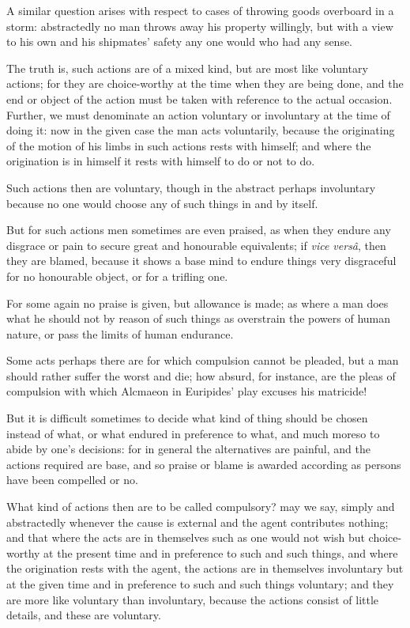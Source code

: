 A similar question arises with respect to cases of throwing goods overboard in
a storm: abstractedly no man throws away his property willingly, but with a
view to his own and his shipmates’ safety any one would who had any
sense.

The truth is, such actions are of a mixed kind, but are most like voluntary
actions; for they are choice-worthy at the time when they are being done, and
the end or object of the action must be taken with reference to the actual
occasion. Further, we must denominate an action voluntary or involuntary at the
time of doing it: now in the given case the man acts voluntarily, because the
originating of the motion of his limbs in such actions rests with himself; and
where the origination is in himself it rests with himself to do or not to do.

Such actions then are voluntary, though in the abstract perhaps involuntary
because no one would choose any of such things in and by itself.

But for such actions men sometimes are even praised, as when they endure any
disgrace or pain to secure great and honourable equivalents; if \emph{vice
versâ}, then they are blamed, because it shows a base mind to endure things
very disgraceful for no honourable object, or for a trifling one.

For some again no praise is given, but allowance is made; as where a man does
what he should not by reason of such things as overstrain the powers of human
nature, or pass the limits of human endurance.

Some acts perhaps there are for which compulsion cannot be pleaded, but a man
should rather suffer the worst and die; how absurd, for instance, are the pleas
of compulsion with which Alcmaeon in Euripides’ play excuses his
matricide!

But it is difficult sometimes to decide what kind of thing should be chosen
instead of what, or what endured in preference to what, and much moreso to
abide by one’s decisions: for in general the alternatives are painful,
and the actions required are base, and so praise or blame is awarded according
as persons have been compelled or no.

What kind of actions then are to be called compulsory? may we say, simply and
abstractedly whenever the cause is external and the agent contributes nothing;
and that where the acts are in themselves such as one would not wish but
choice-worthy at the present time and in preference to such and such things,
and where the origination rests with the agent, the actions are in themselves
involuntary but at the given time and in preference to such and such things
voluntary; and they are more like voluntary than involuntary, because the
actions consist of little details, and these are voluntary.

